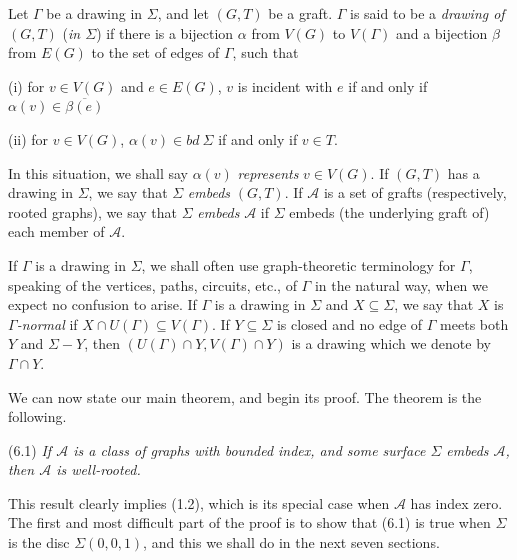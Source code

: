 Let $\Gamma$ be a drawing in $\Sigma$, and let $(G, T)$ be a graft. $\Gamma$ is said to be a \textit{drawing of} $(G, T)$ (\textit{in $\Sigma$}) if there is a bijection $\alpha$ from $V(G)$ to $V(\Gamma)$ and a bijection $\beta$ from $E(G)$ to the set of edges of $\Gamma$, such that

\hspace*{12pt}(i) for $v \in V(G)$ and $e \in E(G)$, $v$ is incident with $e$ if and only if $\alpha(v) \in \overline{\beta(e)}$

\hspace*{12pt}(ii) for $v \in V(G)$, $\alpha(v) \in bd\ \Sigma$ if and only if $v \in T$.

In this situation, we shall say $\alpha(v)$ \textit{represents} $v \in V(G)$. If $(G, T)$ has a drawing in $\Sigma$, we say that $\Sigma$ \textit{embeds} $(G, T)$. If $\mathcal{A}$ is a set of grafts (respectively, rooted graphs), we say that $\Sigma$ \textit{embeds} $\mathcal{A}$ if $\Sigma$ embeds (the underlying graft of) each member of $\mathcal{A}$.

If $\Gamma$ is a drawing in $\Sigma$, we shall often use graph-theoretic terminology for $\Gamma$, speaking of the vertices, paths, circuits, etc., of $\Gamma$ in the natural way, when we expect no confusion to arise. If $\Gamma$ is a drawing in $\Sigma$ and $X \subseteq \Sigma$, we say that $X$ is \textit{$\Gamma$-normal} if $X \cap U(\Gamma) \subseteq V(\Gamma)$. If $Y \subseteq \Sigma$ is closed and no edge of $\Gamma$ meets both $Y$ and $\Sigma - Y$, then $(U(\Gamma) \cap Y, V(\Gamma) \cap Y)$ is a drawing which we denote by $\Gamma \cap Y$.


We can now state our main theorem, and begin its proof. The theorem is the following.

\stmt
(6.1) \textit{If $\mathcal{A}$ is a class of graphs with bounded index, and some surface $\Sigma$ embeds $\mathcal{A}$, then $\mathcal{A}$ is well-rooted.}

This result clearly implies (1.2), which is its special case when $\mathcal{A}$ has index zero. The first and most difficult part of the proof is to show that (6.1) is true when $\Sigma$ is the disc $\Sigma(0, 0, 1)$, and this we shall do in the next seven sections.

